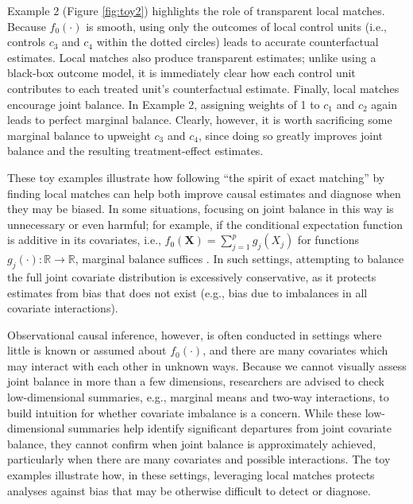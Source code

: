 \documentclass{article}
\newcommand{\bX}{\mathbf{X}}
\newcommand{\R}{\mathbb{R}}
\begin{document}
Example 2 (Figure \ref{fig:toy2}) highlights the role of transparent local matches.
Because $f_0(\cdot)$ is smooth, using only the outcomes of local control units (i.e., controls $c_3$ and $c_4$ within the dotted circles) leads to accurate counterfactual estimates.
Local matches also produce transparent estimates;
unlike using a black-box outcome model, it is immediately clear how each control unit contributes to each treated unit's counterfactual estimate.
Finally, local matches encourage joint balance.
In Example 2, assigning weights of 1 to $c_1$ and $c_2$ again leads to perfect marginal balance.
Clearly, however, it is worth sacrificing some marginal balance to upweight $c_3$ and $c_4$, since doing so greatly improves joint balance and the resulting treatment-effect estimates.


These toy examples illustrate how following ``the spirit of exact matching'' by finding local matches can help both improve causal estimates and diagnose when they may be biased.
In some situations, focusing on joint balance in this way is unnecessary or even harmful;
for example, if the conditional expectation function is additive in its covariates, i.e., $f_0(\bX) = \sum_{j=1}^p g_j(X_j)$ for functions $g_j(\cdot):\R \to \R$, marginal balance suffices \citep{zubizarreta2015stable}.
In such settings, attempting to balance the full joint covariate distribution is excessively conservative, as it protects estimates from bias that does not exist (e.g., bias due to imbalances in all covariate interactions).

Observational causal inference, however, is often conducted in settings where little is known or assumed about $f_0(\cdot)$, and there are many covariates which may interact with each other in unknown ways.
Because we cannot visually assess joint balance in more than a few dimensions, researchers are advised to check low-dimensional summaries, e.g., marginal means and two-way interactions, to build intuition for whether covariate imbalance is a concern.
While these low-dimensional summaries help identify significant departures from joint covariate balance, they cannot confirm when joint balance is approximately achieved, particularly when there are many covariates and possible interactions.
The toy examples illustrate how, in these settings, leveraging local matches protects analyses against bias that may be otherwise difficult to detect or diagnose.
\end{document}
